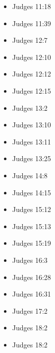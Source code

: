 \documentclass[14pt]{article}
\begin{document}
\begin{multicols}{2}
\begin{itemize}
			\item Judges 11:18
			
			\item Judges 11:39
			
			\item Judges 12:7
			
			\item Judges 12:10
			
			\item Judges 12:12
			
			\item Judges 12:15
			
			\item Judges 13:2
			
			\item Judges 13:10
			
			\item Judges 13:11
			
			\item Judges 13:25
			
			\item Judges 14:8
			
			\item Judges 14:15
			
			\item Judges 15:12
			
			\item Judges 15:13
			
			\item Judges 15:19
			
			\item Judges 16:3
			
			\item Judges 16:28
			
			\item Judges 16:31
			
			\item Judges 17:2
			
			\item Judges 18:2
			
			\item Judges 18:2
			

\end{itemize}
\end{multicols}
\end{document}
